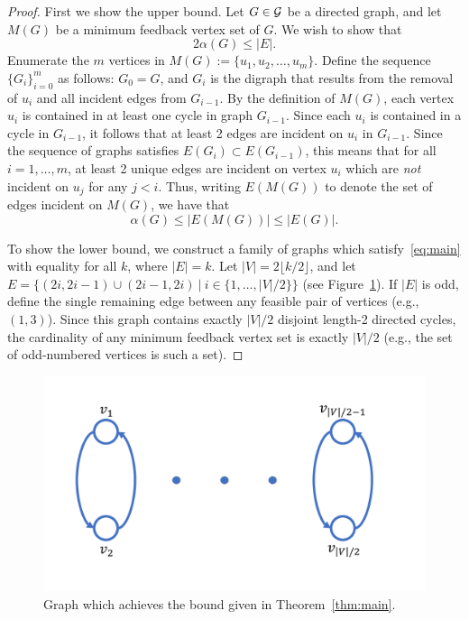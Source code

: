 \documentclass[journal,12pt,onecolumn]{IEEETran}  %
\begin{document}
\begin{proof}
First we show the upper bound.
Let $G\in\mathcal{G}$ be a directed graph, and let $M(G)$ be a minimum feedback vertex set of $G$.
We wish to show that 
\begin{equation}
2\alpha(G)\leq |E|.
\end{equation}
Enumerate the $m$ vertices in $M(G):=\{u_1,u_2,\ldots,u_m\}$.
Define the sequence $\{G_i\}_{i=0}^m$ as follows: $G_0=G$, and $G_i$ is the digraph that results from the removal of $u_i$ and all incident edges from $G_{i-1}$.
By the definition of $M(G)$, each vertex $u_i$ is contained in at least one cycle in graph $G_{i-1}$.
Since each $u_i$ is contained in a cycle in $G_{i-1}$, it follows that at least 2 edges are incident on $u_i$ in $G_{i-1}$.
Since the sequence of graphs satisfies $E(G_{i})\subset E(G_{i-1})$, this means that for all $i=1,\ldots,m$, at least 2 unique edges are incident on vertex $u_i$ which are \emph{not} incident on $u_j$ for any $j<i$.
%
Thus, writing $E(M(G))$ to denote the set of edges incident on $M(G)$, we have that
\begin{equation}
\alpha(G)\leq|E(M(G))|\leq |E(G)|.
\end{equation}

To show the lower bound, we construct a family of graphs which satisfy~\eqref{eq:main} with equality for all $k$, where $|E|=k$.
Let $|V|=2\lfloor k/2\rfloor$, and let $E=\{(2i,2i-1)\cup(2i-1,2i)\ |\ i\in\{1,\ldots,|V|/2\}\}$ (see Figure~\ref{fig:graph}).
If $|E|$ is odd, define the single remaining edge between any feasible pair of vertices (e.g., $(1,3)$).
Since this graph contains exactly $|V|/2$ disjoint length-2 directed cycles, the cardinality of any minimum feedback vertex set is exactly $|V|/2$ (e.g., the set of odd-numbered vertices is such a set).
%
\end{proof}

\begin{figure}
\centering
\includegraphics[width=.6\textwidth]{gfx/graph}
\caption{\label{fig:graph} Graph which achieves the bound given in Theorem~\ref{thm:main}.}
\end{figure}








\end{document}
